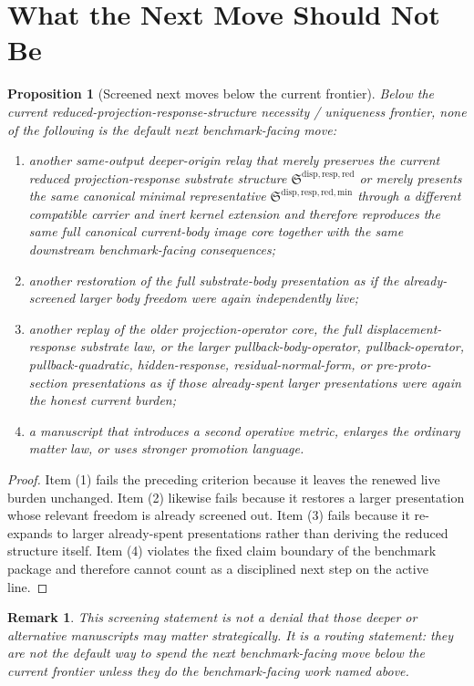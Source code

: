 \documentclass[11pt]{article}
\newcommand{\ReducedStructure}{\mathfrak S^{\mathrm{disp,resp,red}}}
\newcommand{\MinimalReducedStructure}{\mathfrak S^{\mathrm{disp,resp,red,min}}}
\newtheorem{proposition}{Proposition}
\newtheorem{remark}{Remark}
\begin{document}
\section{What the Next Move Should Not Be}

\begin{proposition}[Screened next moves below the current frontier]
Below the current reduced-projection-response-structure necessity / uniqueness frontier, none of the following is the default next benchmark-facing move:
\begin{enumerate}
    \item another same-output deeper-origin relay that merely preserves the current reduced projection-response substrate structure \(\ReducedStructure\) or merely presents the same canonical minimal representative \(\MinimalReducedStructure\) through a different compatible carrier and inert kernel extension and therefore reproduces the same full canonical current-body image core together with the same downstream benchmark-facing consequences;
    \item another restoration of the full substrate-body presentation as if the already-screened larger body freedom were again independently live;
    \item another replay of the older projection-operator core, the full displacement-response substrate law, or the larger pullback-body-operator, pullback-operator, pullback-quadratic, hidden-response, residual-normal-form, or pre-proto-section presentations as if those already-spent larger presentations were again the honest current burden;
    \item a manuscript that introduces a second operative metric, enlarges the ordinary matter law, or uses stronger promotion language.
\end{enumerate}
\end{proposition}

\begin{proof}
Item (1) fails the preceding criterion because it leaves the renewed live burden unchanged. Item (2) likewise fails because it restores a larger presentation whose relevant freedom is already screened out. Item (3) fails because it re-expands to larger already-spent presentations rather than deriving the reduced structure itself. Item (4) violates the fixed claim boundary of the benchmark package and therefore cannot count as a disciplined next step on the active line.
\end{proof}

\begin{remark}
This screening statement is not a denial that those deeper or alternative manuscripts may matter strategically. It is a routing statement: they are not the default way to spend the next benchmark-facing move below the current frontier unless they do the benchmark-facing work named above.
\end{remark}
\end{document}
